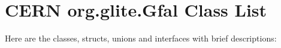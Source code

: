 \section{CERN org.glite.Gfal Class List}
Here are the classes, structs, unions and interfaces with brief descriptions:\begin{CompactList}
\item{}
\end{CompactList}
